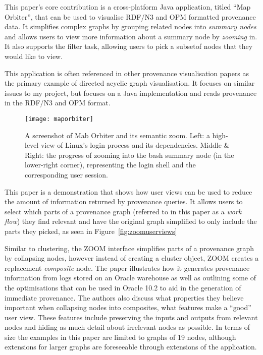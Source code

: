 This paper's core contribution is a cross-platform Java application, titled ``Map Orbiter'', that can be used to visualise RDF/N3 and OPM formatted provenance data. It simplifies complex graphs by grouping related nodes into \textit{summary nodes} and allows users to view more information about a summary node by \textit{zooming} in. It also supports the filter task, allowing users to pick a subsetof nodes that they would like to view. 

This application is often referenced in other provenance visualisation papers as the primary example of directed acyclic graph visualisation. It focuses on similar issues to my project, but focuses on a Java implementation and reads provenance in the RDF/N3 and OPM format.

\begin{figure}[h]
	\centering
	\texttt{[image: maporbiter]}
	\caption{A screenshot of Mab Orbiter and its semantic zoom. Left: a high-level view of Linux’s login process and its dependencies. Middle \& Right: the progress of zooming into the bash summary node (in the lower-right corner), representing the login shell and the corresponding user session.}
	\label{fig:maporbiter}
\end{figure}


This paper is a demonstration that shows how user views can be used to reduce the amount of information returned by provenance queries. It allows users to select which parts of a provenance graph (referred to in this paper as a \textit{work flow}) they find relevant and have the original graph simplified to only include the parts they picked, as seen in Figure~\ref{fig:zoomuserviews}

Similar to clustering, the ZOOM interface simplifies parts of a provenance graph by collapsing nodes, however instead of creating a cluster object, ZOOM creates a replacement \textit{composite} node. The paper illustrates how it generates provenance information from logs stored on an Oracle warehouse as well as outlining some of the optimisations that can be used in Oracle 10.2 to aid in the generation of immediate provenance. The authors also discuss what properties they believe important when collapsing nodes into composites, what features make a ``good'' user view. These features include preserving the inputs and outputs from relevant nodes and hiding as much detail about irrelevant nodes as possible. In terms of size the examples in this paper are limited to graphs of 19 nodes, although extensions for larger graphs are foreseeable through extensions of the application.

